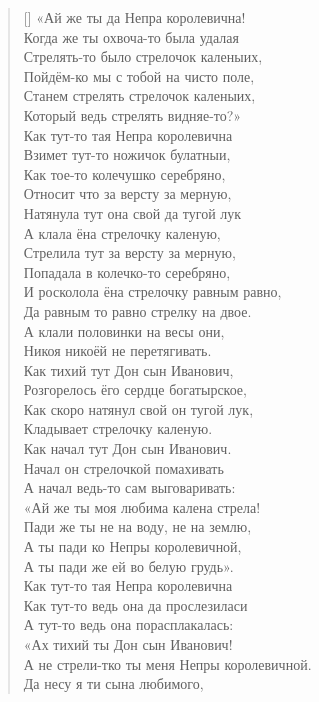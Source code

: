 \begin{verse}[\versewidth]
«Ай же ты да Непра королевична!\\
Когда же ты охвоча-то была удалая\\
Стрелять-то было стрелочок каленыих,\\
Пойдём-ко мы с тобой на чисто поле,\\
Станем стрелять стрелочок каленыих,\\
Который ведь стрелять видняе-то?»\\
Как тут-то тая Непра королевична\\
Взимет тут-то ножичок булатныи,\\
Как тое-то колечушко серебряно,\\
Относит что за версту за мерную,\\
Натянула тут она свой да тугой лук\\
А клала ёна стрелочку каленую,\\
Стрелила тут за версту за мерную,\\
Попадала в колечко-то серебряно,\\
И росколола ёна стрелочку равным равно,\\
Да равным то равно стрелку на двое.\\
А клали половинки на весы они,\\
Никоя никоёй не перетягивать.\\
Как тихий тут Дон сын Иванович,\\
Розгорелось ёго сердце богатырское,\\
Как скоро натянул свой он тугой лук,\\
Кладывает стрелочку каленую.\\
Как начал тут Дон сын Иванович.\\
Начал он стрелочкой помахивать\\
А начал ведь-то сам выговаривать:\\
«Ай же ты моя любима калена стрела!\\
Пади же ты не на воду, не на землю,\\
А ты пади ко Непры королевичной,\\
А ты пади же ей во белую грудь».\\
Как тут-то тая Непра королевична\\
Как тут-то ведь она да прослезиласи\\
А тут-то ведь она порасплакалась:\\
«Ах тихий ты Дон сын Иванович!\\
А не стрели-тко ты меня Непры королевичной.\\
Да несу я ти сына любимого,\\

\end{verse}
